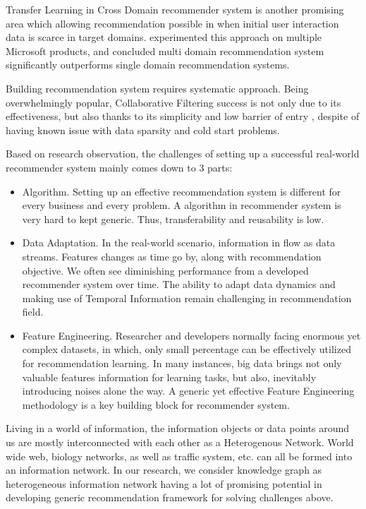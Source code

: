 Transfer Learning \citep{Pan2010} in Cross Domain recommender system is another promising area which allowing recommendation possible in when initial user interaction data is scarce in target domains. \citet{Elkahky2015} experimented this approach on multiple Microsoft products, and concluded multi domain recommendation system significantly outperforms single domain recommendation systems. 

Building recommendation system requires systematic approach. Being overwhelmingly popular, Collaborative Filtering success is not only due to its effectiveness, but also thanks to its simplicity and low barrier of entry \citep{Amatriain2016}, despite of having known issue with data sparsity and cold start problems.

Based on research observation, the challenges of setting up a successful real-world recommender system mainly comes down to 3 parts:  

\begin{itemize}
\item Algorithm. Setting up an effective recommendation system is different for every business and every problem. A algorithm in recommender system is very hard to kept generic. Thus, transferability and reusability is low.

\item Data Adaptation. In the real-world scenario, information in flow as data streams. Features changes as time go by, along with recommendation objective. We often see diminishing performance from a developed recommender system over time. The ability to adapt data dynamics and making use of Temporal Information remain challenging in recommendation field.

\item Feature Engineering. Researcher and developers normally facing enormous yet complex datasets, in which, only small percentage can be effectively utilized for recommendation learning. In many instances, big data brings not only valuable features information for learning tasks, but also, inevitably introducing noises alone the way. A generic yet effective Feature Engineering methodology is a key building block for recommender system.
\end{itemize}

Living in a world of information, the information objects or data points around us are mostly interconnected with each other as a Heterogenous Network. World wide web, biology networks, as well as traffic system, etc. can all be formed into an information network. In our research, we consider knowledge graph as heterogeneous information network having a lot of promising potential in developing generic recommendation framework for solving challenges above.



